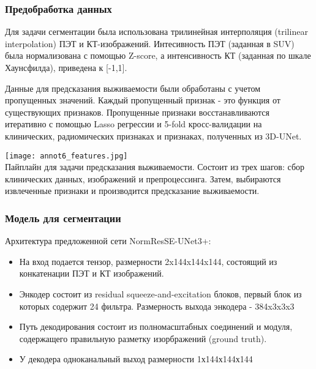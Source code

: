 \subsubsection*{Предобработка данных}
Для задачи сегментации была использована трилинейная интерполяция (trilinear interpolation) ПЭТ и КТ-изображений.
Интесивность ПЭТ (заданная в SUV) была нормализована с помощью Z-score, а интенсивность КТ (заданная по шкале Хаунсфилда), 
приведена к [-1,1]. \par
Данные для предсказания выживаемости были обработаны с учетом пропущенных значений. Каждый пропущенный признак - 
это функция от существующих признаков. Пропущенные признаки восстанавливаются итеративно
с помощью Lasso регрессии и 5-fold кросс-валидации на клинических, радиомических признаках и признаках, полученных из 3D-UNet.



\begin{minipage}{1.0\linewidth}
    \begin{center}
    
    \texttt{[image: annot6\_features.jpg]} \\
    \caption{\scriptsize{Пайплайн для задачи предсказания выживаемости. Состоит из трех шагов:
    сбор клинических данных, изображений и препроцессинга. Затем, выбираются извлеченные признаки и производится 
    предсказание выживаемости.}}
\end{center}
\end{minipage}


\subsubsection*{Модель для сегментации}
Архитектура предложенной сети NormResSE-UNet3+: 
\begin{itemize}
    \item На вход подается тензор, размерности 2x144x144x144, состоящий из конкатенации
    ПЭТ и КТ изображений.
    \item Энкодер состоит из residual squeeze-and-excitation блоков, первый блок из которых 
    содержит 24 фильтра. Размерность выхода энкодера - 384x3x3x3
    \item Путь декодирования состоит из полномасштабных соединений и модуля, содержащего 
    правильную разметку изорбражений (ground truth).
    \item У декодера одноканальный выход размерности 1х144х144х144
\end{itemize}



